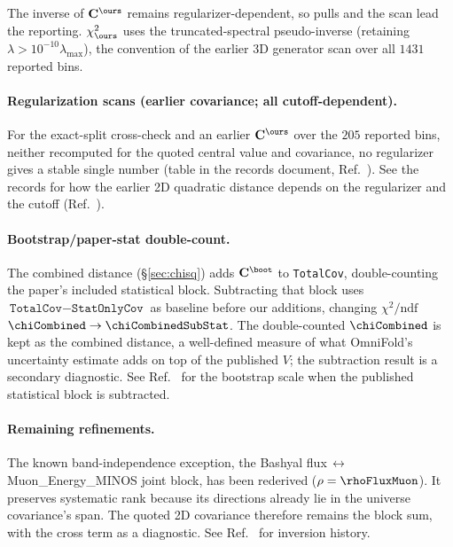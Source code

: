 The inverse of $\mathbf{C}^{\ours}$ remains regularizer-dependent, so pulls and the scan lead the reporting. $\chi^{2}_{\ours}$ uses the truncated-spectral pseudo-inverse (retaining $\lambda>10^{-10}\lambda_{\max}$), the convention of the earlier 3D generator scan over all $1431$ reported bins.

\paragraph{Regularization scans (earlier covariance; all cutoff-dependent).} For the exact-split cross-check and an earlier $\mathbf{C}^{\ours}$ over the $205$ reported bins, neither recomputed for the quoted central value and covariance, no regularizer gives a stable single number (table in the records document, Ref.~\cite{NoteRecords2026}). See the records for how the earlier 2D quadratic distance depends on the regularizer and the cutoff (Ref.~\cite{NoteRecords2026}).

\paragraph{Bootstrap/paper-stat double-count.} The combined distance (\S\ref{sec:chisq}) adds $\mathbf{C}^{\boot}$ to \texttt{TotalCov}, double-counting the paper's included statistical block. Subtracting that block uses $\texttt{TotalCov}-\texttt{StatOnlyCov}$ as baseline before our additions, changing $\chi^{2}/\mathrm{ndf}$ $\chiCombined\to \chiCombinedSubStat$. The double-counted $\chiCombined$ is kept as the combined distance, a well-defined measure of what OmniFold's uncertainty estimate adds on top of the published $V$; the subtraction result is a secondary diagnostic. See Ref.~\cite{NoteRecords2026} for the bootstrap scale when the published statistical block is subtracted.

\paragraph{Remaining refinements.} The known band-independence exception, the Bashyal flux\,$\leftrightarrow$\,Muon\_Energy\_MINOS joint block, has been rederived ($\rho=\rhoFluxMuon$). It preserves systematic rank because its directions already lie in the universe covariance's span. The quoted 2D covariance therefore remains the block sum, with the cross term as a diagnostic. See Ref.~\cite{NoteRecords2026} for inversion history.


